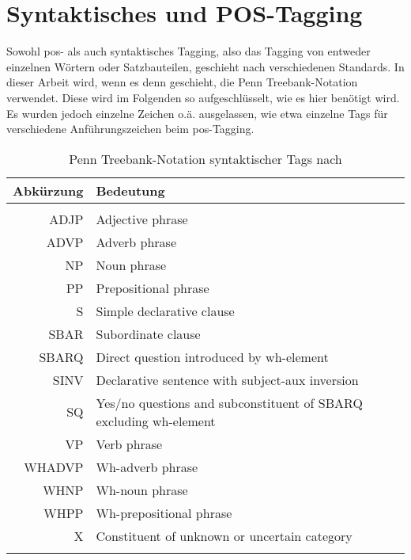 \chapter{Syntaktisches und POS-Tagging}\label{ch:tagging}

Sowohl \ac{pos}- als auch syntaktisches Tagging, also das Tagging von entweder einzelnen Wörtern oder Satzbauteilen, geschieht nach verschiedenen Standards.
In dieser Arbeit wird, wenn es denn geschieht, die Penn Treebank-Notation verwendet.
Diese wird im Folgenden so aufgeschlüsselt, wie es hier benötigt wird.
Es wurden jedoch einzelne Zeichen o.ä. ausgelassen, wie etwa einzelne Tags für verschiedene Anführungszeichen beim \ac{pos}-Tagging.

\begin{longtable}{r l}
  \toprule
  Abkürzung & Bedeutung \\
  \midrule \\
  \endhead
  ADJP & Adjective phrase \\
  ADVP & Adverb phrase \\
  NP & Noun phrase \\
  PP & Prepositional phrase \\
  S & Simple declarative clause \\
  SBAR & Subordinate clause \\
  SBARQ & Direct question introduced by wh-element \\
  SINV & Declarative sentence with subject-aux inversion \\
  SQ & Yes/no questions and subconstituent of SBARQ excluding wh-element \\
  VP & Verb phrase \\
  WHADVP & Wh-adverb phrase \\
  WHNP & Wh-noun phrase \\
  WHPP & Wh-prepositional phrase \\
  X & Constituent of unknown or uncertain category \\
  \bottomrule
  \caption[Penn Treebank-Notation syntaktischer Tags]{Penn Treebank-Notation syntaktischer Tags nach \citet{penntreebankpos}}
  \label{tab:penntreebanksynt}
\end{longtable}

